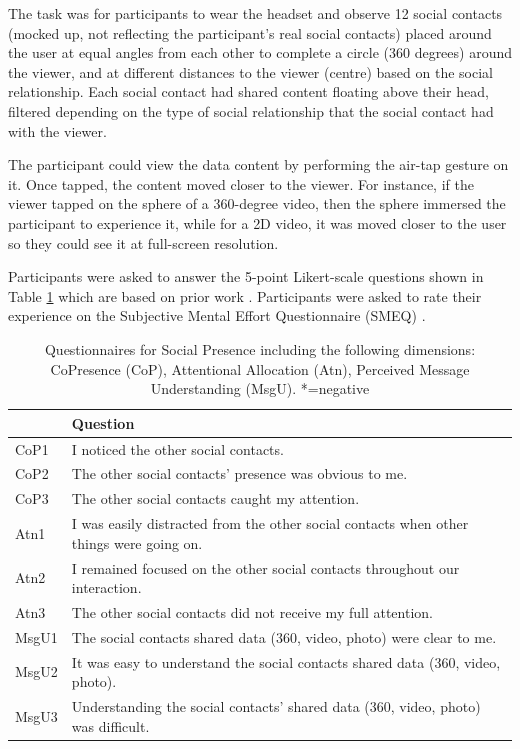 The task was for participants to wear the headset and observe 12 social contacts (mocked up, not reflecting the participant's real social contacts) placed around the user at equal angles from each other to complete a circle (360 degrees) around the viewer, and at different distances to the viewer (centre) based on the social relationship. Each social contact had shared content floating above their head, filtered depending on the type of social relationship that the social contact had with the viewer. 

The participant could view the data content by performing the air-tap gesture on it. Once tapped, the content moved closer to the viewer. For instance, if the viewer tapped on the sphere of a 360-degree video, then the sphere immersed the participant to experience it, while for a 2D video, it was moved closer to the user so they could see it at full-screen resolution.

Participants were asked to answer the 5-point Likert-scale questions shown in Table \ref{tbl:questions} which are based on prior work \cite{Biocca2003}. Participants were asked to rate their experience on the Subjective Mental Effort Questionnaire (SMEQ) \cite{Sauro2009}. 

\begin{table}[ht]
	\centering
	\begin{tabular}{ll}
		\hline
		  & Question \\ \hline
		CoP1 & I noticed the other social contacts.  \\
		CoP2 & The other social contacts' presence was obvious to me. \\
		CoP3 & The other social contacts caught my attention. \\
		Atn1 & I was easily distracted from the other social contacts when other things were going on. \\
		Atn2 & I remained focused on the other social contacts throughout our interaction. \\
		Atn3 & The other social contacts did not receive my full attention.  \\
		MsgU1 & The social contacts shared data (360, video, photo) were clear to me.  \\
		MsgU2 & It was easy to understand the social contacts shared data (360, video, photo).  \\
		MsgU3 & Understanding the social contacts' shared data (360, video, photo) was difficult.  \\ \hline
	\end{tabular}
    \caption{Questionnaires for Social Presence including the following dimensions: CoPresence (CoP), Attentional Allocation (Atn), Perceived Message Understanding (MsgU). *=negative} 
      \label{tbl:questions}
\end{table}

